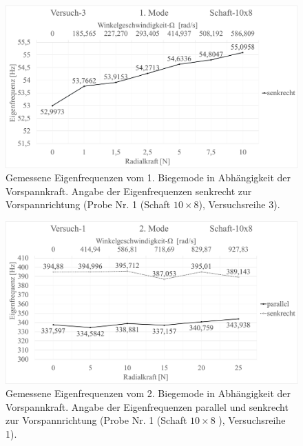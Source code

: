 	\begin{figure}[H]
		\centering
		\includegraphics[width=0.95\linewidth, height=0.36\textheight]{Ergebnisse/Schaft_10x8_1Mode_ver3}
		\caption{Gemessene Eigenfrequenzen vom 1. Biegemode in Abhängigkeit der Vorspannkraft. Angabe der Eigenfrequenzen senkrecht zur Vorspannrichtung (Probe Nr. 1 (Schaft $ 10\times8 $), Versuchsreihe 3).}
		\label{fig:Result-Schaft-10x8-1Mode-Ver3}
	\end{figure}

	\begin{figure}[H]
		\centering
		\includegraphics[width=0.95\linewidth, height=0.36\textheight]{Ergebnisse/Schaft_10x8_2Mode_ver1} 
		\caption{Gemessene Eigenfrequenzen vom 2. Biegemode in Abhängigkeit der Vorspannkraft. Angabe der Eigenfrequenzen parallel und senkrecht zur Vorspannrichtung (Probe Nr. 1 (Schaft $ 10\times8 $ ), Versuchsreihe 1).}
		\label{fig:Result-Schaft-10x8-2Mode-Ver1}
	\end{figure}

